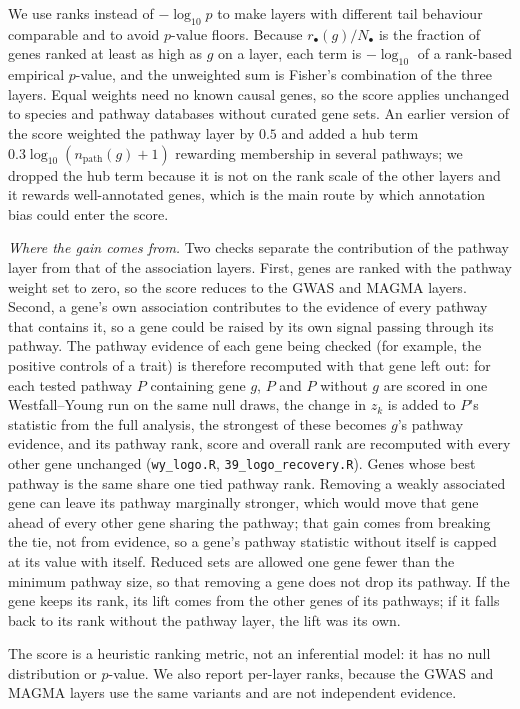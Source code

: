 We use ranks instead of $-\log_{10}p$ to make layers with different tail behaviour comparable and to avoid $p$-value floors. Because $r_\bullet(g)/N_\bullet$ is the fraction of genes ranked at least as high as $g$ on a layer, each term is $-\log_{10}$ of a rank-based empirical $p$-value, and the unweighted sum is Fisher's combination of the three layers. Equal weights need no known causal genes, so the score applies unchanged to species and pathway databases without curated gene sets. An earlier version of the score weighted the pathway layer by $0.5$ and added a hub term $0.3\log_{10}(n_{\mathrm{path}}(g)+1)$ rewarding membership in several pathways; we dropped the hub term because it is not on the rank scale of the other layers and it rewards well-annotated genes, which is the main route by which annotation bias could enter the score.

\emph{Where the gain comes from.} Two checks separate the contribution of the
pathway layer from that of the association layers. First, genes are ranked with
the pathway weight set to zero, so the score reduces to the GWAS and MAGMA
layers. Second, a gene's own association contributes to the evidence of every
pathway that contains it, so a gene could be raised by its own signal passing
through its pathway. The pathway evidence of each gene being checked (for
example, the positive controls of a trait) is therefore recomputed with that
gene left out: for each tested pathway $P$
containing gene $g$, $P$ and $P$ without $g$ are scored in one Westfall--Young
run on the same null draws, the change in $z_k$ is added to $P$'s statistic from
the full analysis, the strongest of these becomes $g$'s pathway evidence, and
its pathway rank, score and overall rank are recomputed with every other gene
unchanged (\texttt{wy\_logo.R}, \texttt{39\_logo\_recovery.R}). Genes whose best
pathway is the same share one tied pathway rank. Removing a weakly associated gene
can leave its pathway marginally stronger, which would move that gene ahead of
every other gene sharing the pathway; that gain comes from breaking the tie, not
from evidence, so a gene's pathway statistic without itself is capped at its
value with itself. Reduced sets
are allowed one gene fewer than the minimum pathway size, so that removing a
gene does not drop its pathway. If the gene keeps its rank, its lift comes from
the other genes of its pathways; if it falls back to its rank without the
pathway layer, the lift was its own.

The score is a heuristic ranking metric, not an inferential model: it has no null distribution or $p$-value. We also report per-layer ranks, because the GWAS and MAGMA layers use the same variants and are not independent evidence.

